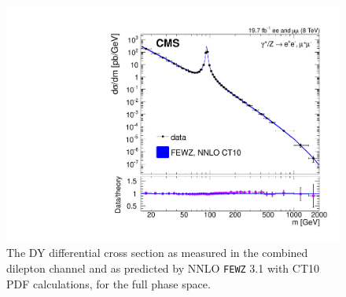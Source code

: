 \begin{figure}[p]
    \centering
    \includegraphics[height=0.3\textheight]{figures/ss-inclboson-drellyan-cms8tev}
    \caption{The DY differential cross section as measured in the combined
dilepton channel and as predicted by NNLO \texttt{FEWZ} 3.1 with CT10 PDF
calculations, for the full phase space.}
    \label{fig:ss-inclboson-drellyan-cms8tev}
\end{figure}
